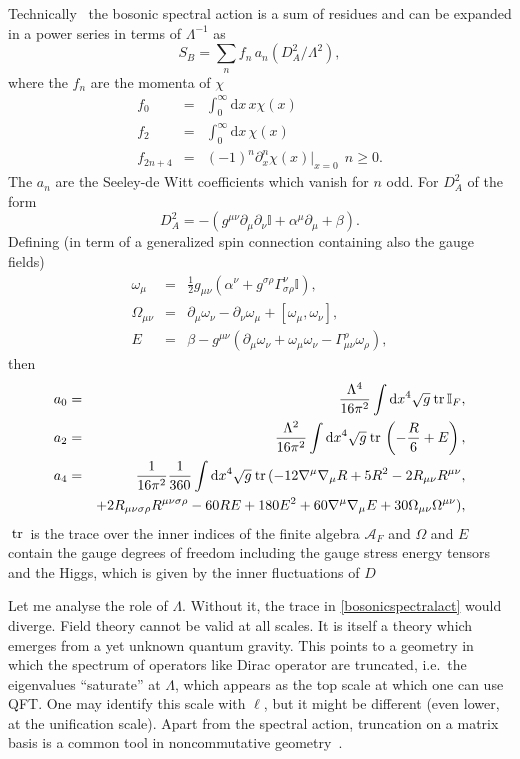 \documentclass[12pt,a4paper]{article}
\newcommand{\be}{\begin{equation}}
\newcommand{\ee}{\end{equation}}
\newcommand{\del}{\partial}
\newcommand{\dd}{\mathrm d}
\newcommand{\tr}[1]{\:{\rm tr}\,#1}
\begin{document}
Technically~\cite{manual} the bosonic spectral action is a sum of residues and can
be expanded in a power series in terms of $\Lambda^{-1}$ as
\be
S_B=\sum_n f_n\, a_n(D_A^2/\Lambda^2),
\ee
where the $f_n$ are the momenta of $\chi$
\begin{eqnarray}
f_0&=&\int_0^\infty \dd x\, x  \chi(x)\nonumber\\
f_2&=&\int_0^\infty \dd x\,   \chi(x)\nonumber\\
f_{2n+4}&=&(-1)^n \del^n_x \chi(x)\bigg|_{x=0} \ \ n\geq 0.
\end{eqnarray}
The $a_n$ are the Seeley-de Witt coefficients which vanish for $n$
odd. For $D_A^2$ of the form
\be
D_A^2=-(g^{\mu\nu}\del_\mu\del_\nu\mathbb I+\alpha^\mu\del_\mu+\beta).
\ee
Defining (in term of a generalized spin connection containing also the gauge
fields)
\begin{eqnarray}
\omega_\mu&=&\frac12 g_{\mu\nu}\left(\alpha^\nu+g^{\sigma\rho} \Gamma^\nu_{\sigma\rho}\mathbb I\right),\nonumber\\
\Omega_{\mu\nu}&=&\del_\mu\omega_\nu-\del_\nu\omega_\mu+[\omega_\mu,\omega_\nu],\nonumber\\
E&=&\beta-g^{\mu\nu}\left(\del_\mu\omega_\nu+\omega_\mu\omega_\nu-\Gamma^\rho_{\mu\nu}\omega_\rho\right),
\end{eqnarray}
then
\begin{eqnarray}
a_0&=&\frac{\Lambda^4}{16\pi^2}\int\dd x^4 \sqrt{g}
\tr\mathbb I_F,\nonumber\\
a_2&=&\frac{\Lambda^2}{16\pi^2}\int\dd x^4 \sqrt{g}
\tr\left(-\frac R6+E\right),\nonumber\\
a_4&=&\frac{1}{16\pi^2}\frac{1}{360}\int\dd x^4 \sqrt{g}
\tr(-12\nabla^\mu\nabla_\mu R +5R^2-2R_{\mu\nu}R^{\mu\nu},\nonumber\\
&&+2R_{\mu\nu\sigma\rho}R^{\mu\nu\sigma\rho}-60RE+180E^2+60\nabla^\mu\nabla_\mu
E+30\Omega_{\mu\nu}\Omega^{\mu\nu}), \label{spectralcoeff}
\end{eqnarray}
$\tr$ is the trace over the inner indices of the finite algebra
$\mathcal A_F$ and  $\Omega$ and $E$  contain the gauge
degrees of freedom including the gauge stress energy tensors and the
Higgs, which is given by the inner fluctuations of $D$

Let me analyse the role of $\Lambda$. Without it, the trace in \eqref{bosonicspectralact} would diverge. Field theory cannot be valid at all scales. It is itself a theory which emerges from a yet unknown quantum gravity.
This points to a geometry in which the spectrum of operators like Dirac operator are  {truncated}, i.e.\ the eigenvalues ``saturate'' at $\Lambda$, which appears as the top scale at which one can use QFT. One may identify this scale with $\ell$, but it might be different (even lower, at the unification scale). Apart from the spectral action, truncation on a matrix basis is a common tool in noncommutative geometry~\cite{matrixreview}.
\end{document}

